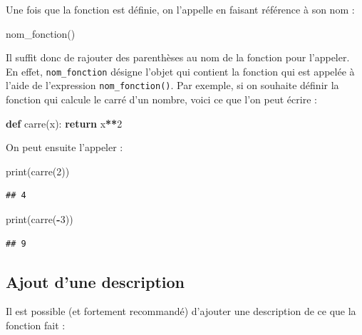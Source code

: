 \documentclass[12pt,]{book}
\newenvironment{Shaded}{\begin{snugshade}}{\end{snugshade}}
\newcommand{\KeywordTok}[1]{\textcolor[rgb]{0.13,0.29,0.53}{\textbf{#1}}}
\newcommand{\DecValTok}[1]{\textcolor[rgb]{0.00,0.00,0.81}{#1}}
\newcommand{\ControlFlowTok}[1]{\textcolor[rgb]{0.13,0.29,0.53}{\textbf{#1}}}
\newcommand{\OperatorTok}[1]{\textcolor[rgb]{0.81,0.36,0.00}{\textbf{#1}}}
\newcommand{\BuiltInTok}[1]{#1}
\newcommand{\NormalTok}[1]{#1}
\numberwithin{equation}{section}
\numberwithin{countremarque}{section}
\begin{document}
Une fois que la fonction est définie, on l'appelle en faisant référence
à son nom :

\begin{Shaded}
\begin{Highlighting}[]
\NormalTok{nom_fonction()}
\end{Highlighting}
\end{Shaded}

Il suffit donc de rajouter des parenthèses au nom de la fonction pour
l'appeler. En effet, \texttt{nom\_fonction} désigne l'objet qui contient
la fonction qui est appelée à l'aide de l'expression
\texttt{nom\_fonction()}. Par exemple, si on souhaite définir la
fonction qui calcule le carré d'un nombre, voici ce que l'on peut écrire
:

\begin{Shaded}
\begin{Highlighting}[]
\KeywordTok{def}\NormalTok{ carre(x):}
  \ControlFlowTok{return}\NormalTok{ x}\OperatorTok{**}\DecValTok{2}
\end{Highlighting}
\end{Shaded}

On peut ensuite l'appeler :

\begin{Shaded}
\begin{Highlighting}[]
\BuiltInTok{print}\NormalTok{(carre(}\DecValTok{2}\NormalTok{))}
\end{Highlighting}
\end{Shaded}

\begin{lstlisting}
## 4
\end{lstlisting}

\begin{Shaded}
\begin{Highlighting}[]
\BuiltInTok{print}\NormalTok{(carre(}\OperatorTok{-}\DecValTok{3}\NormalTok{))}
\end{Highlighting}
\end{Shaded}

\begin{lstlisting}
## 9
\end{lstlisting}

\subsection{Ajout d'une description}\label{ajout-dune-description}

Il est possible (et fortement recommandé) d'ajouter une description de
ce que la fonction fait :
\end{document}
